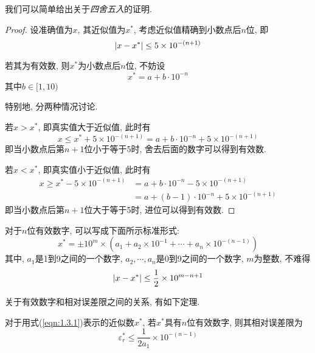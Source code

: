 \begin{extend}
    我们可以简单给出关于\emph{四舍五入}的证明.

    \begin{proof}
        设准确值为$x$, 其近似值为$x^*$, 考虑近似值精确到小数点后$n$位, 即
        \begin{equation*}
            \abs{x-x^*}\le5\times10^{-(n+1)}
        \end{equation*}

        若其为有效数, 则$x^*$为小数点后$n$位, 不妨设
        \begin{equation*}
            x^*=a+b\cdot10^{-n}
        \end{equation*}
        其中$b\in[1,10)$

        特别地, 分两种情况讨论. 

        若$x>x^*$, 即真实值大于近似值, 此时有
        \begin{equation*}
            x\le x^*+5\times10^{-(n+1)}=a+b\cdot10^{-n}+5\times10^{-(n+1)}
        \end{equation*}
        即当小数点后第$n+1$位小于等于5时, 舍去后面的数字可以得到有效数.

        若$x<x^*$, 即真实值小于近似值, 此时有
        \begin{align*}
            x\ge x^*-5\times10^{-(n+1)}&=a+b\cdot10^{-n}-5\times10^{-(n+1)}\\
            &=a+(b-1)\cdot10^{-n}+5\times10^{-(n+1)}
        \end{align*}
        即当小数点后第$n+1$位大于等于5时, 进位可以得到有效数.
    \end{proof}
\end{extend}

对于$n$位有效数字, 可以写成下面所示标准形式:
\begin{equation}\label{eqn:1.3.1}
    x^*=\pm10^m\times\left(a_1+a_2\times10^{-1}+\cdots+a_n\times10^{-(n-1)}\right)
\end{equation}
其中, $a_1$是1到9之间的一个数字, $a_2,\cdots,a_n$是0到9之间的一个数字, $m$为整数, 不难得
\begin{equation*}
    \abs{x-x^*}\le\frac{1}{2}\times10^{m-n+1}
\end{equation*}

关于有效数字和相对误差限之间的关系, 有如下定理.
\begin{theorem}\label{dingli1.1}
    对于用式(\ref{eqn:1.3.1})表示的近似数$x^*$, 若$x^*$具有$n$位有效数字, 则其相对误差限为
    \begin{equation*}
        \varepsilon_r^*\le\frac{1}{2a_1}\times10^{-(n-1)}
    \end{equation*}
\end{theorem}


